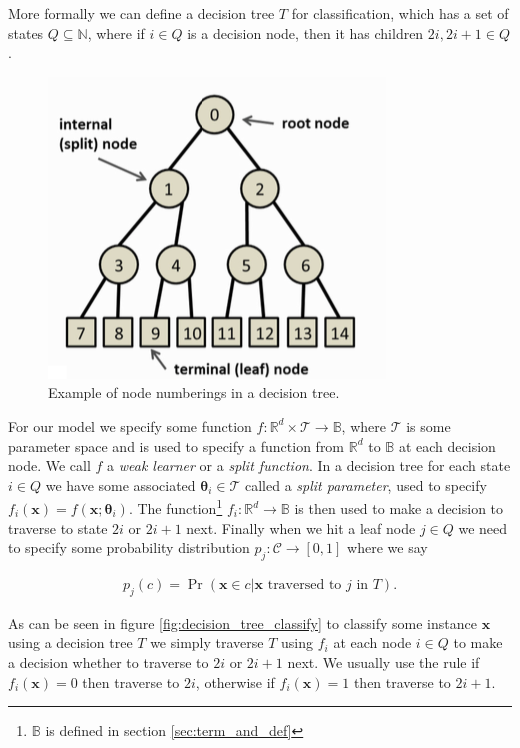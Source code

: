 \documentclass[12pt,twoside,notitlepage]{report}
\newcommand{\vc}[1]{\mathbf{#1}}
\newcommand{\cl}[1]{\mathcal{#1}}
\newcommand{\bb}[1]{\mathbb{#1}}
\begin{document}
            More formally we can define a decision tree $T$ for classification, which has a set of states $Q \subseteq 
            \bb{N}$, where if $i \in Q$ is a decision node, then it has children $2i, 2i+1 \in Q$. 

            \begin{figure}[H]
                \centering
                \includegraphics[scale=0.5]{tree_node_labels}
                \caption{Example of node numberings in a decision tree.}
            \end{figure}

            For our model we specify some function $f:\bb{R}^d \times \cl{T} \rightarrow \bb{B}$, where $\cl{T}$ is some 
            parameter space and is used to specify a function from $\bb{R}^d$ to $\bb{B}$ at each decision node. We call 
            $f$ a \textit{weak learner} or a \textit{split function}. In a decision tree for each state $i \in Q$ we have 
            some associated $\vc{\theta}_i \in \cl{T}$ called a \textit{split parameter}, used to specify 
            $f_i(\vc{x}) = f(\vc{x}; \vc{\theta}_i)$. The function\footnote{$\bb{B}$ is defined in section 
            \ref{sec:term_and_def}} $f_i : \bb{R}^d \rightarrow \bb{B}$ is then used to make a decision to traverse to 
            state $2i$ or $2i+1$ next. Finally when we hit a leaf node $j \in Q$ we need to specify some probability 
            distribution $p_j:\cl{C} \rightarrow [0,1]$ where we say 

            \begin{align}
                p_j(c) = \Pr(\vc{x} \in c | \vc{x} \text{ traversed to } j \text{ in } T).
            \end{align}

            As can be seen in figure \ref{fig:decision_tree_classify} to classify some instance $\vc{x}$ using a 
            decision tree $T$ we simply traverse $T$ using $f_i$ at each node $i \in Q$ to make a decision whether 
            to traverse to $2i$ or $2i+1$ next. We usually use the rule if $f_i(\vc{x}) = 0$ then traverse to 
            $2i$, otherwise if $f_i(\vc{x}) = 1$ then traverse to $2i+1$. \cite{criminisi2013decision}
\end{document}
